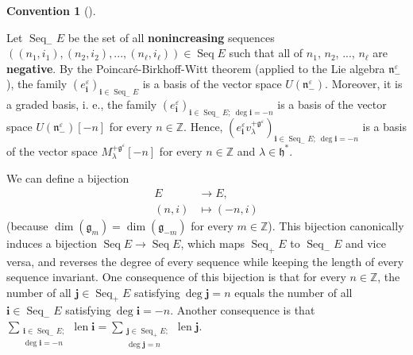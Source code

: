 \documentclass
[numbers=enddot,12pt,final,onecolumn,german,notitlepage]{scrartcl}%
\theoremstyle{definition}
\newtheorem{conv}[theo]{Convention}
\newenvironment{Convention}[1][]
{\begin{conv}[#1]\begin{leftbar}}
{\end{leftbar}\end{conv}}
\begin{document}
\begin{Convention}
Let $\operatorname*{Seq}\nolimits_{-}E$ be the set of all
\textbf{nonincreasing} sequences $\left(  \left(  n_{1},i_{1}\right)  ,\left(
n_{2},i_{2}\right)  ,...,\left(  n_{\ell},i_{\ell}\right)  \right)
\in\operatorname*{Seq}E$ such that all of $n_{1}$, $n_{2}$, $...$, $n_{\ell}$
are \textbf{negative}. By the Poincar\'{e}-Birkhoff-Witt theorem (applied to
the Lie algebra $\mathfrak{n}_{-}^{\varepsilon}$), the family $\left(
e_{\mathbf{i}}^{\varepsilon}\right)  _{\mathbf{i}\in\operatorname*{Seq}%
\nolimits_{-}E}$ is a basis of the vector space $U\left(  \mathfrak{n}%
_{-}^{\varepsilon}\right)  $. Moreover, it is a graded basis, i. e., the
family $\left(  e_{\mathbf{i}}^{\varepsilon}\right)  _{\mathbf{i}%
\in\operatorname*{Seq}\nolimits_{-}E;\ \deg\mathbf{i}=-n}$ is a basis of the
vector space $U\left(  \mathfrak{n}_{-}^{\varepsilon}\right)  \left[
-n\right]  $ for every $n\in\mathbb{Z}$. Hence, $\left(  e_{\mathbf{i}%
}^{\varepsilon}v_{\lambda}^{+\mathfrak{g}^{\varepsilon}}\right)
_{\mathbf{i}\in\operatorname*{Seq}\nolimits_{-}E;\ \deg\mathbf{i}=-n}$ is a
basis of the vector space $M_{\lambda}^{+\mathfrak{g}^{\varepsilon}}\left[
-n\right]  $ for every $n\in\mathbb{Z}$ and $\lambda\in\mathfrak{h}^{\ast}$.

We can define a bijection%
\begin{align*}
E  &  \rightarrow E,\\
\left(  n,i\right)   &  \mapsto\left(  -n,i\right)
\end{align*}
(because $\dim\left(  \mathfrak{g}_{m}\right)  =\dim\left(  \mathfrak{g}%
_{-m}\right)  $ for every $m\in\mathbb{Z}$). This bijection canonically
induces a bijection $\operatorname*{Seq}E\rightarrow\operatorname*{Seq}E$,
which maps $\operatorname*{Seq}\nolimits_{+}E$ to $\operatorname*{Seq}%
\nolimits_{-}E$ and vice versa, and reverses the degree of every sequence
while keeping the length of every sequence invariant. One consequence of this
bijection is that for every $n\in\mathbb{Z}$, the number of all $\mathbf{j}%
\in\operatorname*{Seq}\nolimits_{+}E$ satisfying$\ \deg\mathbf{j}=n$ equals
the number of all $\mathbf{i}\in\operatorname*{Seq}\nolimits_{-}E$
satisfying$\ \deg\mathbf{i}=-n$. Another consequence is that $\sum
\limits_{\substack{\mathbf{i}\in\operatorname*{Seq}\nolimits_{-}%
E;\\\deg\mathbf{i}=-n}}\operatorname*{len}\mathbf{i=}\sum
\limits_{\substack{\mathbf{j}\in\operatorname*{Seq}\nolimits_{+}%
E;\\\deg\mathbf{j}=n}}\operatorname*{len}\mathbf{j}$.


\end{Convention}
\end{document}
